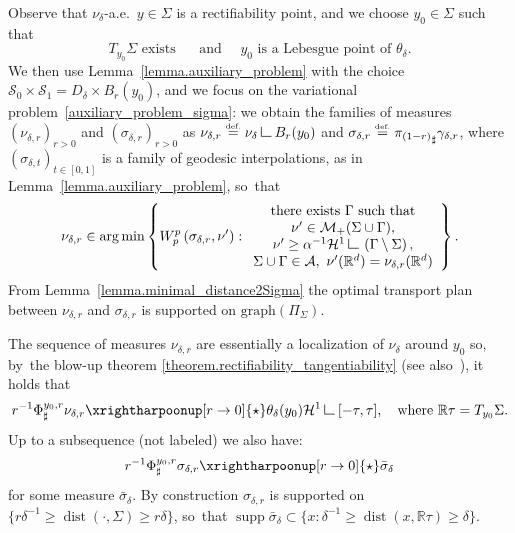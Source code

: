 \documentclass[JEP,XML,SOM,Unicode,NoFloatCountersInSection,published]{cedram}
\let\ts\textstyle
\theoremstyle{definition}
\newcommand{\eqdef}{\ensuremath{\stackrel{\mbox{\upshape\tiny def.}}{=}}}
\newcommand\LM[1]{\hbox{\vrule width.5pt \vbox to#1pt{\vfill \hrule width#1pt height.5pt}}}
\newcommand\LL{{\mathchoice {\>\LM7\>}{\>\LM7\>}{\,\LM5\,}{\,\LM{3.35}\,}}}
\newcommand{\mres}{\LL}
\newcommand{\RR}{\mathbb{R}}
\DeclareMathOperator*{\argmin}{arg\,min}
\DeclareMathOperator{\dist}{dist}
\DeclareMathOperator{\supp}{supp}
\begin{document}
Observe that $\nu_\delta$-a.e.~$y \in \Sigma$ is a rectifiability point, and we choose $y_0 \in \Sigma$ such that
\begin{equation}\label{y0fixed_for_blowup}
T_{y_0}\Sigma \text{ exists }
\quad\text{ and } \quad
y_0 \text{ is a Lebesgue point of }
\theta_\delta.
\end{equation}
We then use Lemma~\ref{lemma.auxiliary_problem} with the choice $\mathcal{S}_0\times \mathcal{S}_1 = D_{\delta}\times B_r(y_0)$, and we focus on the variational problem~\eqref{auxiliary_problem_sigma}: we obtain the families of measures $\left(\nu_{\delta ,r}\right)_{r > 0}$ and $\left(\sigma_{\delta ,r}\right)_{r > 0}$ as $\nu_{\delta ,r} \eqdef \nu_\delta \mres B_r(y_0)$ and $\sigma_{\delta ,r} \eqdef {\pi_{(1-r)}}_\sharp\gamma_{\delta,r}$, where $\left(\sigma_{\delta,t}\right)_{t \in [0,1]}$ is a family of geodesic interpolations, as in Lemma~\ref{lemma.auxiliary_problem}, so~that
\begin{equation}\label{auxiliary_problem_geodesic}
\nu_{\delta ,r}
\in
\argmin
\left\{
W_p^p\left(
\sigma_{\delta ,r}, \nu'
\right) :
\begin{array}{c}
\text{there exists $\Gamma$ such that}\\
\nu' \in \mathcal{M}_+(\Sigma \cup \Gamma),\\
\nu' \ge \alpha^{-1}\mathcal{H}^1\mres \left(\Gamma\setminus \Sigma\right), \\
\Sigma \cup \Gamma \in \mathcal{A}, \
\nu'(\RR^d) = \nu_{\delta ,r}(\RR^d)
\end{array}
\right\}.
\end{equation}
From Lemma~\ref{lemma.minimal_distance2Sigma} the optimal transport plan between $\nu_{\delta ,r}$ and $\sigma_{\delta ,r}$ is supported on $\text{graph}(\Pi_\Sigma)$.

The sequence of measures $\nu_{\delta ,r}$ are essentially a localization of $\nu_\delta$ around $y_0$ so, by~the blow-up theorem \ref{theorem.rectifiability_tangentiability} (see also~\cite[Th.\,2.83]{ambrosio2000functions}), it holds that
\begin{equation}\label{blowup_measures_nu}
r^{-1}\Phi^{y_0,r}_{\sharp}\nu_{\delta ,r} \xrightharpoonup[r \to 0]{\ts\star}
\theta_\delta(y_0)\mathcal{H}^1\mres [-\tau, \tau],
\quad\text{where $\RR\tau = T_{y_0}\Sigma$.}
\end{equation}
Up to a subsequence (not labeled) we also have:
\begin{equation}\label{blowup_measures_sigma}
r^{-1}\Phi^{y_0,r}_{\sharp}\sigma_{\delta ,r} \xrightharpoonup[r \to 0]{\ts\star}
\bar \sigma_{\delta}
\end{equation}
for some measure $\bar \sigma_{\delta}$.
By construction $\sigma_{\delta ,r}$ is supported on $\{r\delta^{-1}\ge\dist(\cdot,\Sigma)\ge r\delta\}$, so~that $\supp \bar \sigma_{\delta} \subset \{x : \delta^{-1} \ge \dist(x,\RR\tau) \ge \delta \}$.
\end{document}
